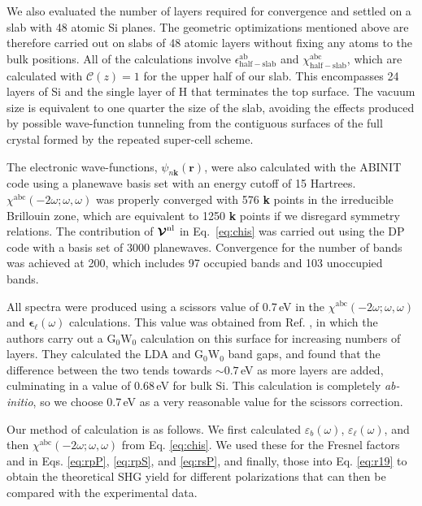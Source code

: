 We also evaluated the number of layers required for convergence and settled on a
slab with 48 atomic Si planes. The geometric optimizations mentioned above are
therefore carried out on slabs of 48 atomic layers without fixing any atoms to
the bulk positions. All of the calculations involve
$\epsilon^{\mathrm{ab}}_{\mathrm{half-slab}}$ and
$\chi^{\mathrm{abc}}_{\mathrm{half-slab}}$, which are calculated with
${\mathbf{\mathcal{C}}}(z)=1$ for the upper half of our slab. This encompasses
24 layers of Si and the single layer of H that terminates the top surface. The
vacuum size is equivalent to one quarter the size of the slab, avoiding the
effects produced by possible wave-function tunneling from the contiguous
surfaces of the full crystal formed by the repeated super-cell
scheme.\cite{mendozaPRB06}

The electronic wave-functions, $\psi_{n\mathbf{k}}(\mathbf{r})$, were also
calculated with the ABINIT code using a planewave basis set with an energy
cutoff of 15 Hartrees. $\chi^{\mathrm{abc}}(-2\omega;\omega,\omega)$ was
properly converged with 576 \textbf{k} points in the irreducible Brillouin zone,
which are equivalent to 1250 \textbf{k} points if we disregard symmetry
relations. The contribution of $\boldsymbol{\mathcal{\cal V}}^\mathrm{nl}$ in
Eq.~\eqref{eq:chis} was carried out using the DP\cite{olevanoDP} code with a
basis set of 3000 planewaves. Convergence for the number of bands was achieved
at 200, which includes 97 occupied bands and 103 unoccupied bands.

All spectra were produced using a scissors value of 0.7\,eV in the
$\chi^{\mathrm{abc}}(-2\omega;\omega,\omega)$ and
$\boldsymbol{\epsilon}_{\ell}(\omega)$ calculations. This value was obtained
from Ref. \cite{liPRB10}, in which the authors carry out a
$\mathrm{G}_{0}\mathrm{W}_{0}$ calculation on this surface for increasing
numbers of layers. They calculated the LDA and $\mathrm{G}_{0}\mathrm{W}_{0}$
band gaps, and found that the difference between the two tends towards
$\sim0.7$\,eV as more layers are added, culminating in a value of 0.68\,eV for
bulk Si. This calculation is completely \emph{ab-initio}, so we choose 0.7\,eV
as a very reasonable value for the scissors correction.

Our method of calculation is as follows. We first calculated
$\varepsilon_{b}(\omega)$, $\varepsilon_{\ell}(\omega)$, and then
$\chi^{\mathrm{abc}}(-2\omega;\omega,\omega)$ from Eq. \eqref{eq:chis}. We used
these for the Fresnel factors and in Eqs. \eqref{eq:rpP}, \eqref{eq:rpS}, and
\eqref{eq:rsP}, and finally, those into Eq. \eqref{eq:r19} to obtain the
theoretical SHG yield for different polarizations that can then be compared with
the experimental data.



